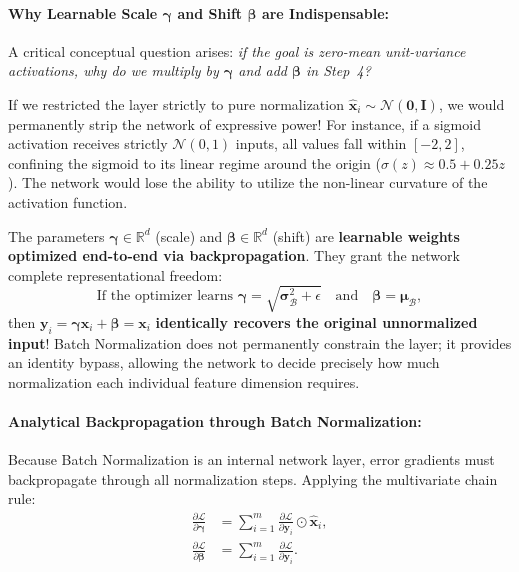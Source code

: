 \paragraph{Why Learnable Scale $\boldsymbol{\gamma}$ and Shift $\boldsymbol{\beta}$ are Indispensable:}
A critical conceptual question arises: \textit{if the goal is zero-mean unit-variance activations, why do we multiply by $\boldsymbol{\gamma}$ and add $\boldsymbol{\beta}$ in Step~4?}

If we restricted the layer strictly to pure normalization $\hat{\mathbf{x}}_i \sim \mathcal{N}(\mathbf{0}, \mathbf{I})$, we would permanently strip the network of expressive power! For instance, if a sigmoid activation receives strictly $\mathcal{N}(0, 1)$ inputs, all values fall within $[-2, 2]$, confining the sigmoid to its linear regime around the origin ($\sigma(z) \approx 0.5 + 0.25z$). The network would lose the ability to utilize the non-linear curvature of the activation function.

The parameters $\boldsymbol{\gamma} \in \mathbb{R}^d$ (scale) and $\boldsymbol{\beta} \in \mathbb{R}^d$ (shift) are \textbf{learnable weights optimized end-to-end via backpropagation}. They grant the network complete representational freedom:
\begin{equation}
\text{If the optimizer learns } \boldsymbol{\gamma} = \sqrt{\boldsymbol{\sigma}_{\mathcal{B}}^2 + \epsilon} \quad \text{and} \quad \boldsymbol{\beta} = \boldsymbol{\mu}_{\mathcal{B}},
\end{equation}
then $\mathbf{y}_i = \boldsymbol{\gamma} \hat{\mathbf{x}}_i + \boldsymbol{\beta} = \mathbf{x}_i$ \textbf{identically recovers the original unnormalized input}! Batch Normalization does not permanently constrain the layer; it provides an identity bypass, allowing the network to decide precisely how much normalization each individual feature dimension requires.

\paragraph{Analytical Backpropagation through Batch Normalization:}
Because Batch Normalization is an internal network layer, error gradients must backpropagate through all normalization steps. Applying the multivariate chain rule:
\begin{align}
\frac{\partial \mathcal{L}}{\partial \boldsymbol{\gamma}} &= \sum_{i=1}^m \frac{\partial \mathcal{L}}{\partial \mathbf{y}_i} \odot \hat{\mathbf{x}}_i, \label{eq:bn_grad_gamma} \\
\frac{\partial \mathcal{L}}{\partial \boldsymbol{\beta}} &= \sum_{i=1}^m \frac{\partial \mathcal{L}}{\partial \mathbf{y}_i}. \label{eq:bn_grad_beta}
\end{align}

